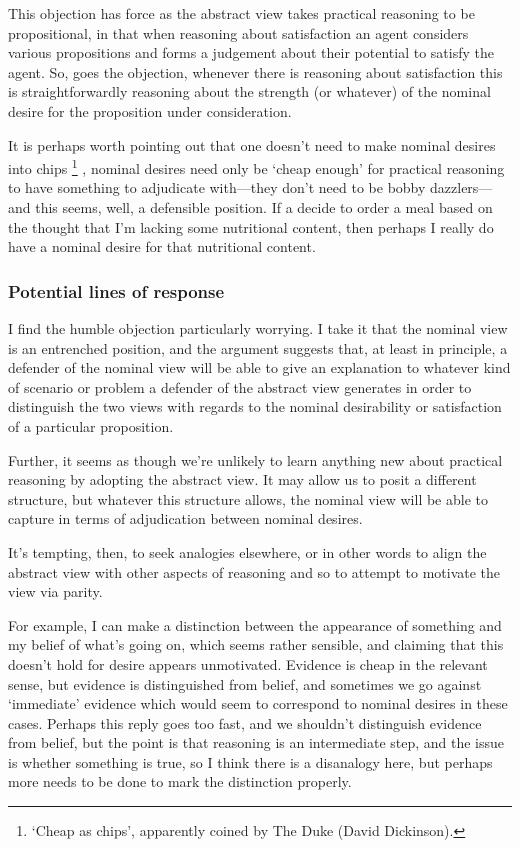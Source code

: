 \documentclass[10pt]{article}
\begin{document}
This objection has force as the abstract view takes practical reasoning to be propositional, in that when reasoning about satisfaction an agent considers various propositions and forms a judgement about their potential to satisfy the agent.
So, goes the objection, whenever there is reasoning about satisfaction this is straightforwardly reasoning about the strength (or whatever) of the nominal desire for the proposition under consideration.

It is perhaps worth pointing out that one doesn't need to make nominal desires into chips\nolinebreak
\footnote{`Cheap as chips', apparently coined by The Duke (David Dickinson).}\nolinebreak
, nominal desires need only be `cheap enough' for practical reasoning to have something to adjudicate with---they don't need to be bobby dazzlers---and this seems, well, a defensible position.
If a decide to order a meal based on the thought that I'm lacking some nutritional content, then perhaps I really do have a nominal desire for that nutritional content.

\subsubsection{Potential lines of response}
\label{sec:potent-lines-resp}

I find the humble objection particularly worrying.
I take it that the nominal view is an entrenched position, and the argument suggests that, at least in principle, a defender of the nominal view will be able to give an explanation to whatever kind of scenario or problem a defender of the abstract view generates in order to distinguish the two views with regards to the nominal desirability or satisfaction of a particular proposition.

Further, it seems as though we're unlikely to learn anything new about practical reasoning by adopting the abstract view.
It may allow us to posit a different structure, but whatever this structure allows, the nominal view will be able to capture in terms of adjudication between nominal desires.

It's tempting, then, to seek analogies elsewhere, or in other words to align the abstract view with other aspects of reasoning and so to attempt to motivate the view via parity.

For example, I can make a distinction between the appearance of something and my belief of what's going on, which seems rather sensible, and claiming that this doesn't hold for desire appears unmotivated.
Evidence is cheap in the relevant sense, but evidence is distinguished from belief, and sometimes we go against `immediate' evidence which would seem to correspond to nominal desires in these cases.
Perhaps this reply goes too fast, and we shouldn't distinguish evidence from belief, but the point is that reasoning is an intermediate step, and the issue is whether something is true, so I think there is a disanalogy here, but perhaps more needs to be done to mark the distinction properly.
\end{document}
